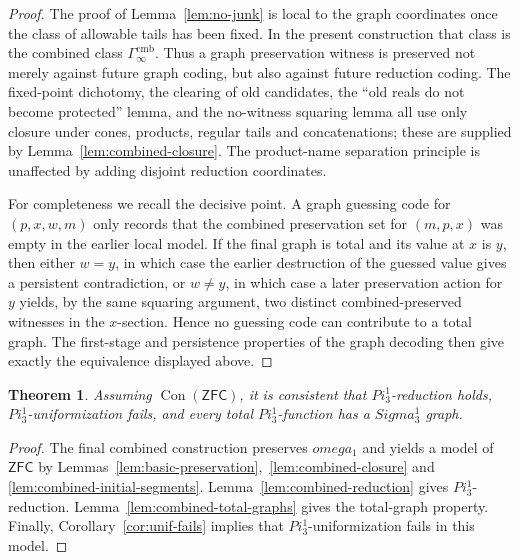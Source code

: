 \documentclass{article}
\newtheorem{theorem}{Theorem}[section]
\theoremstyle{remark}
\theoremstyle{plain}
\newcommand{\ZFC}{\mathsf{ZFC}}
\def\mathbf#1{#1}%
\def\Pi{Pi}%
\def\Sigma{Sigma}%
\def\omega{omega}%
\begin{document}
\begin{proof}
The proof of Lemma~\ref{lem:no-junk} is local to the graph coordinates once the
class of allowable tails has been fixed. In the present construction that class
is the combined class $\Gamma^{\mathrm{cmb}}_\infty$. Thus a graph preservation
witness is preserved not merely against future graph coding, but also against
future reduction coding. The fixed-point dichotomy, the clearing of old
candidates, the ``old reals do not become protected'' lemma, and the no-witness
squaring lemma all use only closure under cones, products, regular tails and
concatenations; these are supplied by Lemma~\ref{lem:combined-closure}. The
product-name separation principle is unaffected by adding disjoint reduction
coordinates.

For completeness we recall the decisive point. A graph guessing code for
$(p,x,w,m)$ only records that the combined preservation set for $(m,p,x)$ was
empty in the earlier local model. If the final graph is total and its value at
$x$ is $y$, then either $w=y$, in which case the earlier destruction of the guessed value gives a persistent contradiction, or $w\neq y$, in which case a
later preservation action for $y$ yields, by the same squaring argument, two
distinct combined-preserved witnesses in the $x$-section. Hence no guessing code
can contribute to a total graph. The first-stage and persistence properties of
the graph decoding then give exactly the equivalence displayed above.
\end{proof}

\begin{theorem}\label{thm:final}
Assuming $\operatorname{Con}(\ZFC)$, it is consistent that
$\mathbf{\Pi}^1_3$-reduction holds, $\mathbf{\Pi}^1_3$-uniformization fails, and
every total $\mathbf{\Pi}^1_3$-function has a $\mathbf{\Sigma}^1_3$ graph.
\end{theorem}

\begin{proof}
The final combined construction preserves $\omega_1$ and yields a model of
$\ZFC$ by Lemmas~\ref{lem:basic-preservation},~\ref{lem:combined-closure} and
\ref{lem:combined-initial-segments}. Lemma~\ref{lem:combined-reduction} gives
$\mathbf{\Pi}^1_3$-reduction. Lemma~\ref{lem:combined-total-graphs} gives the
total-graph property. Finally, Corollary~\ref{cor:unif-fails} implies that
$\mathbf{\Pi}^1_3$-uniformization fails in this model.
\end{proof}




\end{document}
